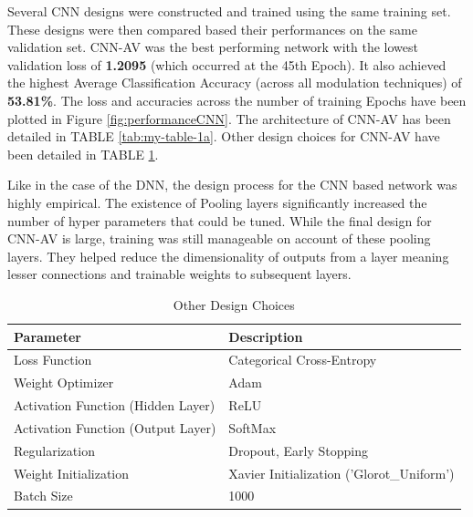 \documentclass[journal,onecolumn]{IEEEtran}
\begin{document}
Several CNN designs were constructed and trained using the same training set. These designs were then compared based their performances on the same validation set. CNN-AV was the best performing network with the lowest validation loss of \textbf{1.2095} (which occurred at the 45th Epoch). It also achieved the highest Average Classification Accuracy (across all modulation techniques) of \textbf{53.81\%}. The loss and accuracies across the number of training Epochs have been plotted in Figure \ref{fig:performanceCNN}. The architecture of CNN-AV has been detailed in TABLE \ref{tab:my-table-1a}. Other design choices for CNN-AV have been detailed in TABLE \ref{tab:my-table-1b}.

Like in the case of the DNN, the design process for the CNN based network was highly empirical. The existence of Pooling layers significantly increased the number of hyper parameters that could be tuned. While the final design for CNN-AV is large, training was still manageable on account of these pooling layers. They helped reduce the dimensionality of outputs from a layer meaning lesser connections and trainable weights to subsequent layers. 

\begin{table}[]
\centering
\caption{Other Design Choices}
\label{tab:my-table-1b}
\begin{tabular}{@{}ll@{}}
\toprule
Parameter                          & Description                               \\ \midrule
Loss Function                      & Categorical Cross-Entropy                 \\
Weight Optimizer                   & Adam                                      \\
Activation Function (Hidden Layer) & ReLU                                      \\
Activation Function (Output Layer) & SoftMax                                   \\
Regularization                     & Dropout, Early Stopping                   \\
Weight Initialization              & Xavier Initialization ('Glorot\_Uniform') \\
Batch Size                         & 1000                                      \\ \bottomrule
\end{tabular}
\end{table}
\end{document}
